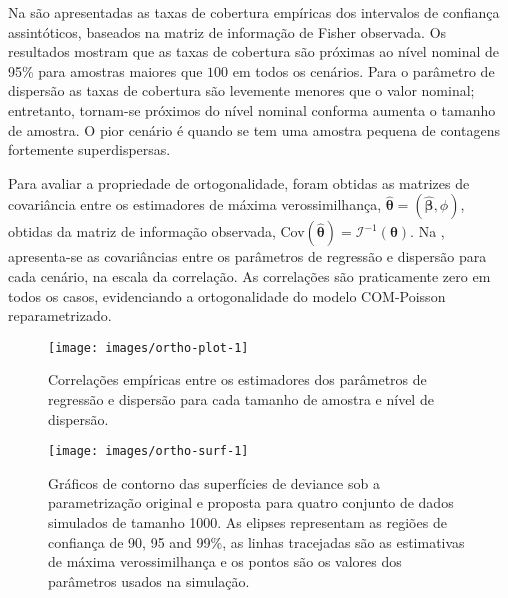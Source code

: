 \documentclass[
    oldfontcommands,
    11pt,
    openright,
    twoside,
    a4paper,
    english,
    brazil
]{abntex2}\usepackage[]{graphicx}\usepackage[]{color}
\begin{document}
Na  são apresentadas as taxas de cobertura
empíricas dos intervalos de confiança assintóticos, baseados na matriz
de informação de Fisher observada. Os resultados mostram que as taxas
de cobertura são próximas ao nível nominal de 95\% para amostras maiores
que $100$ em todos os cenários. Para o parâmetro de dispersão as taxas
de cobertura são levemente menores que o valor nominal; entretanto,
tornam-se próximos do nível nominal conforma aumenta o tamanho de
amostra. O pior cenário é quando se tem uma amostra pequena de contagens
fortemente superdispersas.

Para avaliar a propriedade de ortogonalidade, foram obtidas as matrizes
de covariância entre os estimadores de máxima verossimilhança,
$\hat{\bm{\theta}} = (\hat{\bm{\beta}}, \phi)$, obtidas da matriz de
informação observada,
Cov$(\hat{\bm{\theta}}) = \mathcal{I}^{-1}(\bm{\theta})$.
Na , apresenta-se as covariâncias entre os
parâmetros de regressão e dispersão para cada cenário, na escala da
correlação. As correlações são praticamente zero em todos os casos,
evidenciando a ortogonalidade do modelo COM-Poisson
reparametrizado.

\begin{figure}[!htb]

{\centering \texttt{[image: images/ortho-plot-1]} 

}

\caption[Correlações empíricas entre os estimadores dos parâmetros de regressão e dispersão para cada tamanho de amostra e nível de dispersão]{Correlações empíricas entre os estimadores dos parâmetros de regressão e dispersão para cada tamanho de amostra e nível de dispersão.}\label{fig:ortho-plot}
\end{figure}



\begin{figure}[!htb]

{\centering \texttt{[image: images/ortho-surf-1]} 

}

\caption[Gráficos de contorno das superfícies de deviance sob a parametrização original e proposta para quatro conjunto de dados simulados de tamanho 1000]{Gráficos de contorno das superfícies de deviance sob a parametrização original e proposta para quatro conjunto de dados simulados de tamanho 1000. As elipses representam as regiões de confiança de 90, 95 and 99\%, as linhas tracejadas são as estimativas de máxima verossimilhança e os pontos são os valores dos parâmetros usados na simulação.}\label{fig:ortho-surf}
\end{figure}
\end{document}
